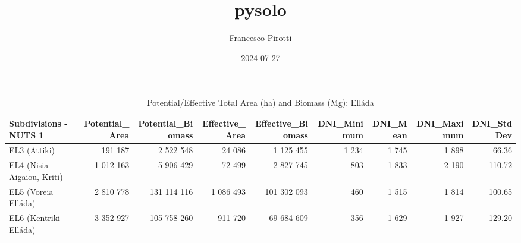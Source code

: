 \documentclass[
  a4paper]{article}
\title{pysolo}
\author{Francesco Pirotti}
\date{2024-07-27}
\begin{document}
\maketitle

\begin{table}

\caption{\label{tab:table 1}Potential/Effective Total Area (ha) and Biomass (Mg): Elláda}
\centering
\begin{tabular}[t]{lrrrrrrrr}
\toprule
Subdivisions - NUTS 1 & Potential\_Area & Potential\_Biomass & Effective\_Area & Effective\_Biomass & DNI\_Minimum & DNI\_Mean & DNI\_Maximum & DNI\_StdDev\\
\midrule
EL3 (Attiki) & 191 187 & 2 522 548 & 24 086 & 1 125 455 & 1 234 & 1 745 & 1 898 & 66.36\\
EL4 (Nisia Aigaiou, Kriti) & 1 012 163 & 5 906 429 & 72 499 & 2 827 745 & 803 & 1 833 & 2 190 & 110.72\\
EL5 (Voreia Elláda) & 2 810 778 & 131 114 116 & 1 086 493 & 101 302 093 & 460 & 1 515 & 1 814 & 100.65\\
EL6 (Kentriki Elláda) & 3 352 927 & 105 758 260 & 911 720 & 69 684 609 & 356 & 1 629 & 1 927 & 129.20\\
\bottomrule
\end{tabular}
\end{table}
\end{document}
